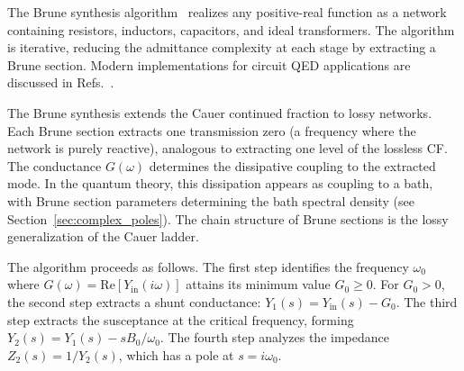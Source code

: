 \documentclass[reprint, floatfix, superscriptaddress, amsmath, amssymb, longbibliography]{revtex4-2}
\begin{document}
The Brune synthesis algorithm~\cite{Brune1931} realizes any positive-real function as a network containing resistors, inductors, capacitors, and ideal transformers. The algorithm is iterative, reducing the admittance complexity at each stage by extracting a Brune section. Modern implementations for circuit QED applications are discussed in Refs.~\cite{Solgun2014, Solgun2015}.

The Brune synthesis extends the Cauer continued fraction to lossy networks. Each Brune section extracts one transmission zero (a frequency where the network is purely reactive), analogous to extracting one level of the lossless CF. The conductance $G(\omega)$ determines the dissipative coupling to the extracted mode. In the quantum theory, this dissipation appears as coupling to a bath, with Brune section parameters determining the bath spectral density (see Section~\ref{sec:complex_poles}). The chain structure of Brune sections is the lossy generalization of the Cauer ladder. 

The algorithm proceeds as follows. The first step identifies the frequency $\omega_0$ where $G(\omega) = \mathrm{Re}[Y_{\mathrm{in}}(i\omega)]$ attains its minimum value $G_0 \geq 0$. For $G_0 > 0$, the second step extracts a shunt conductance: $Y_1(s) = Y_{\mathrm{in}}(s) - G_0$. The third step extracts the susceptance at the critical frequency, forming $Y_2(s) = Y_1(s) - sB_0/\omega_0$. The fourth step analyzes the impedance $Z_2(s) = 1/Y_2(s)$, which has a pole at $s = i\omega_0$.
\end{document}
